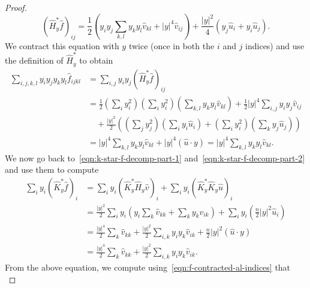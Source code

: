 \documentclass[10pt,a4paper]{amsart}
\newcommand{\abs}[1]{\lvert #1 \rvert}
\begin{document}
\begin{proof}
\begin{equation}
\label{eqn:h-star-f}
(\widehat{H}^*_y\widehat f)_{ij}
=
\frac{1}{2}
\left(
y_iy_j\sum_{k,l}
y_ky_l\widehat v_{kl}
+
\abs{y}^4
\widehat v_{ij}
\right)
+
\frac{\abs{y}^2}{4}
\left(
y_j\widehat u_i+y_i\widehat u_j
\right).
\end{equation}
We contract this equation with $y$ twice (once in both the $i$ and $j$ indices) and use the definition of $\widehat{H}^*_y$ to obtain
\begin{equation}
\label{eqn:f-contracted-al-indices}
\begin{split}
\sum_{i,j,k,l}
y_iy_jy_ky_l
\widehat f_{ijkl}
&=
\sum_{i,j}
y_iy_j(\widehat{H}^*_y\widehat f)_{ij}
\\
&=
\frac12
\left(
\sum_i
y_i^2
\right)
\left(
\sum_i
y_i^2
\right)
\left(
\sum_{k,l}
y_ky_l\widehat v_{kl}
\right)
+
\frac12\abs{y}^4
\sum_{i,j}
y_iy_j\widehat v_{ij}
\\
&\quad
+
\frac{\abs{y}^2}{2}
\left(
\left(
\sum_j y_j^2
\right)
\left(
\sum_i
y_i\widehat u_i
\right)
+
\left(
\sum_i y_i^2
\right)
\left(
\sum_k
y_j\widehat u_j
\right)
\right)
\\
&=
\abs{y}^4
\sum_{k,l}y_ky_l\widehat v_{kl}
+
\abs{y}^4(\widehat u \cdot y)=
\abs{y}^4
\sum_{k,l}y_ky_l\widehat v_{kl}.
\end{split}
\end{equation}
We now go back to~\eqref{eqn:k-star-f-decomp-part-1} and~\eqref{eqn:k-star-f-decomp-part-2} and use them to compute
\begin{equation}
\begin{split}
\sum_{i}
y_i(\widehat{K}_y^*\widehat f)_i
&=
\sum_{i}
y_i(\widehat{K}_y^*\widehat{H}_y\widehat v)_i
+
\sum_{i}
y_i(\widehat{K}_y^*\widehat{K}_y\widehat u)_i
\\
&=
\frac{\abs{y}^2}{2}
\sum_{i}
y_i
\left(
y_i
\sum_{k}
\widehat v_{kk}
+
\sum_{k}
y_k\widehat v_{ik}
\right)
+
\sum_{i}
y_i
\left(
\frac{n}{2}
\abs{y}^2\widehat u_i
\right)
\\
&=
\frac{\abs{y}^4}{2}
\sum_{k}
\widehat v_{kk}
+
\frac{\abs{y}^2}{2}
\sum_{i,k}
y_iy_k
\widehat v_{ik}
+
\frac{n}{2}\abs{y}^2(\widehat u \cdot y)
\\
&=
\frac{\abs{y}^4}{2}
\sum_{k}
\widehat v_{kk}
+
\frac{\abs{y}^2}{2}
\sum_{i,k}
y_iy_k
\widehat v_{ik}.
\end{split}
\end{equation}
From the above equation, we compute using~\eqref{eqn:f-contracted-al-indices} that
\begin{equation}

\end{equation}
\end{proof}
\end{document}
